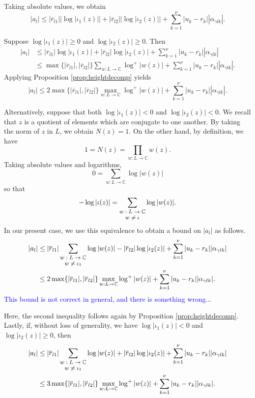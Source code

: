 \documentclass[11pt]{report}
\theoremstyle{definition}
\newcommand{\edit}[1]{\textcolor{blue}{#1}}
\begin{document}
Taking absolute values, we obtain
\[|a_l| \leq |\overline{r}_{l1}||\log|\iota_1(z)|| + |\overline{r}_{l2}||\log|\iota_2(z)|| + \sum_{k=1}^{\nu}|u_k-r_k||\alpha_{\gamma l k}|.\]

Suppose $\log|\iota_1(z)| \geq 0$ and $\log|\iota_2(z)| \geq 0$. Then
\begin{align*}
|a_l| 	& \leq |\overline{r}_{l1}|\log|\iota_1(z)| + |\overline{r}_{l2}|\log|\iota_2(z)| + \sum_{k=1}^{\nu}|u_k-r_k||\alpha_{\gamma l k}|\\
	&  \leq \max\{|\overline{r}_{l1}|, |\overline{r}_{l2}|\}\sum_{w: L \to \mathbb{C}}\log^+|w(z)| + \sum_{k=1}^{\nu}|u_k-r_k||\alpha_{\gamma l k}|.
\end{align*}
Applying Proposition \ref{prop:heightdecomp} yields
\[|a_l| \leq 2\max\{|\overline{r}_{l1}|, |\overline{r}_{l2}|\}\max_{w:L\to \mathbb{C}} \log^+|w(z)| +  \sum_{k=1}^{\nu}|u_k-r_k||\alpha_{\gamma l k}|.\]

Alternatively, suppose that both $\log|\iota_1(z)| < 0$ and $\log|\iota_2(z)| < 0$. We recall that $z$ is a quotient of elements which are conjugate to one another. By taking the norm of $z$ in $L$, we obtain $N(z) = 1.$ On the other hand, by definition, we have
\[1 = N(z) = \prod_{w : L \to \mathbb{C}}w(z).\]
Taking absolute values and logarithms,
\[0 = \sum_{w: L \to \mathbb{C}} \log|w(z)|\]
so that
\[ -\log|\iota(z)| = \sum_{\shortstack{\footnotesize $w: L \to \mathbb{C} $\\ \footnotesize $ w\neq \iota$}} \log|w(z)|.\]
In our present case, we use this equivalence to obtain a bound on $|a_l|$ as follows.
\begin{align*}
|a_l| 	& \leq |\overline{r}_{l1}|\sum_{\shortstack{\footnotesize $w: L \to \mathbb{C} $\\ \footnotesize $w \neq \iota_1$}} \log|w(z)| - |\overline{r}_{l2}|\log|\iota_2(z)| + \sum_{k=1}^{\nu}|u_k-r_k||\alpha_{\gamma l k}|\\
	& \leq 2\max\{|\overline{r}_{l1}|, |\overline{r}_{l2}|\}\max_{w: L \to \mathbb{C}} \log^+|w(z)|  + \sum_{k=1}^{\nu}|u_k-r_k||\alpha_{\gamma l k}|.
\end{align*}
\edit{This bound is not correct in general, and there is something wrong...}

Here, the second inequality follows again by Proposition \ref{prop:heightdecomp}. Lastly, if, without loss of generality, we have $\log|\iota_1(z)| < 0$ and $\log|\iota_2(z)| \geq 0$, then
\begin{align*}
|a_l| 	& \leq |\overline{r}_{l1}|\sum_{\shortstack{\footnotesize $w: L \to \mathbb{C} $\\ \footnotesize $w \neq \iota_1$}} \log|w(z)| + |\overline{r}_{l2}|\log|\iota_2(z)| + \sum_{k=1}^{\nu}|u_k-r_k||\alpha_{\gamma l k}|\\
	& \leq 3\max\{|\overline{r}_{l1}|, |\overline{r}_{l2}|\}\max_{w: L \to \mathbb{C}} \log^+|w(z)| + \sum_{k=1}^{\nu}|u_k-r_k||\alpha_{\gamma l k}|.
\end{align*}
\end{document}
